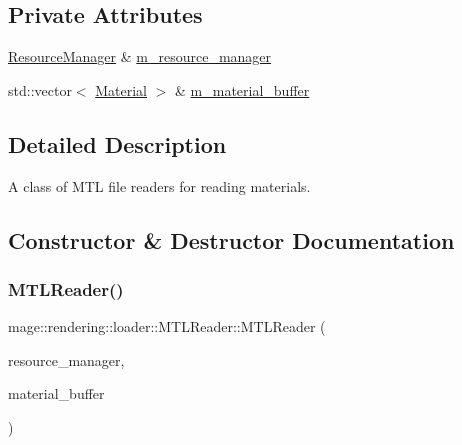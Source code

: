 \subsection*{Private Attributes}
\begin{DoxyCompactItemize}
\item 
\hyperlink{classmage_1_1rendering_1_1_resource_manager}{Resource\+Manager} \& \hyperlink{classmage_1_1rendering_1_1loader_1_1_m_t_l_reader_aa227ae7e44df08b1973171ff165eadb8}{m\+\_\+resource\+\_\+manager}
\item 
std\+::vector$<$ \hyperlink{classmage_1_1rendering_1_1_material}{Material} $>$ \& \hyperlink{classmage_1_1rendering_1_1loader_1_1_m_t_l_reader_ae2fef19220c95fa5593fb43ea86c7293}{m\+\_\+material\+\_\+buffer}
\end{DoxyCompactItemize}


\subsection{Detailed Description}
A class of M\+TL file readers for reading materials. 

\subsection{Constructor \& Destructor Documentation}
\hypertarget{classmage_1_1rendering_1_1loader_1_1_m_t_l_reader_a3615f6899de22b53de1bad257ac34099}{}\label{classmage_1_1rendering_1_1loader_1_1_m_t_l_reader_a3615f6899de22b53de1bad257ac34099} 
\subsubsection{\texorpdfstring{M\+T\+L\+Reader()}{MTLReader()}\hspace{0.1cm}{\footnotesize\ttfamily [1/3]}}
{\footnotesize\ttfamily mage\+::rendering\+::loader\+::\+M\+T\+L\+Reader\+::\+M\+T\+L\+Reader (\begin{DoxyParamCaption}\item[{\hyperlink{classmage_1_1rendering_1_1_resource_manager}{Resource\+Manager} \&}]{resource\+\_\+manager,  }\item[{std\+::vector$<$ \hyperlink{classmage_1_1rendering_1_1_material}{Material} $>$ \&}]{material\+\_\+buffer }\end{DoxyParamCaption})\hspace{0.3cm}{\ttfamily [explicit]}}

